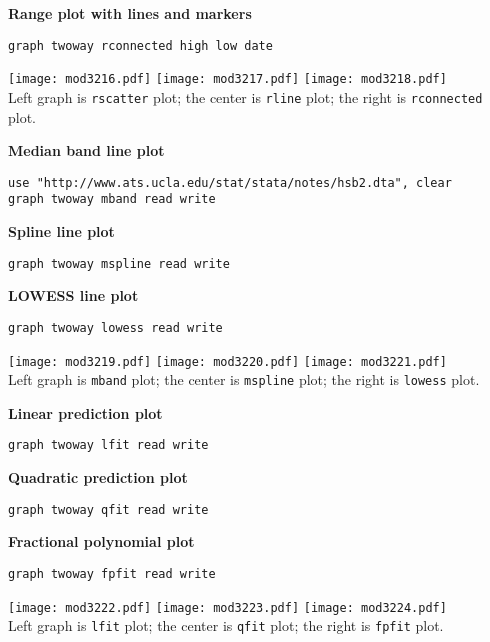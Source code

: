 \textbf{Range plot with lines and markers}
\begin{lstlisting}
graph twoway rconnected high low date
\end{lstlisting}

\begin{center}
\texttt{[image: mod3216.pdf]}
\texttt{[image: mod3217.pdf]}
\texttt{[image: mod3218.pdf]}\\
Left graph is \lstinline{rscatter} plot; the center is \lstinline{rline} plot; the right is \lstinline{rconnected} plot.
\end{center}

\textbf{Median band line plot}
\begin{lstlisting}
use "http://www.ats.ucla.edu/stat/stata/notes/hsb2.dta", clear
graph twoway mband read write
\end{lstlisting}

\textbf{Spline line plot}
\begin{lstlisting}
graph twoway mspline read write
\end{lstlisting}

\textbf{LOWESS line plot}
\begin{lstlisting}
graph twoway lowess read write
\end{lstlisting}

\begin{center}
\texttt{[image: mod3219.pdf]}
\texttt{[image: mod3220.pdf]}
\texttt{[image: mod3221.pdf]}\\
Left graph is \lstinline{mband} plot; the center is \lstinline{mspline} plot; the right is \lstinline{lowess} plot.
\end{center}


\textbf{Linear prediction plot}
\begin{lstlisting}
graph twoway lfit read write
\end{lstlisting}

\textbf{Quadratic prediction plot}
\begin{lstlisting}
graph twoway qfit read write
\end{lstlisting}

\textbf{Fractional polynomial plot}
\begin{lstlisting}
graph twoway fpfit read write
\end{lstlisting}

\begin{center}
\texttt{[image: mod3222.pdf]}
\texttt{[image: mod3223.pdf]}
\texttt{[image: mod3224.pdf]}\\
Left graph is \lstinline{lfit} plot; the center is \lstinline{qfit} plot; the right is \lstinline{fpfit} plot.
\end{center}



